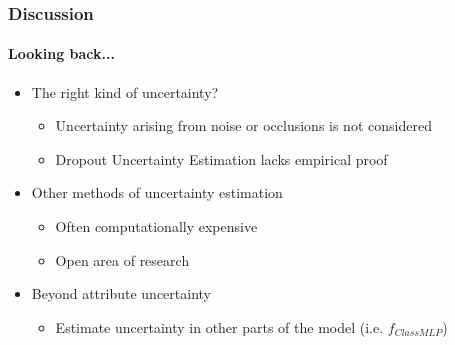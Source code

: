 \documentclass[9pt]{beamer}
\begin{document}
\begin{frame}
\frametitle{Discussion}
\framesubtitle{Looking back...}
\begin{itemize}
	\item The right kind of uncertainty?
	\begin{itemize}
		\item Uncertainty arising from noise or occlusions is not considered
		\item Dropout Uncertainty Estimation lacks empirical proof
	\end{itemize}
	\item Other methods of uncertainty estimation%
	\begin{itemize}
		\item Often computationally expensive
		\item Open area of research
	\end{itemize}
	\item Beyond attribute uncertainty
	\begin{itemize}
		\item Estimate uncertainty in other parts of the model (i.e. $f_{ClassMLP}$)
	\end{itemize}
\end{itemize}
\end{frame} 
\end{document}
